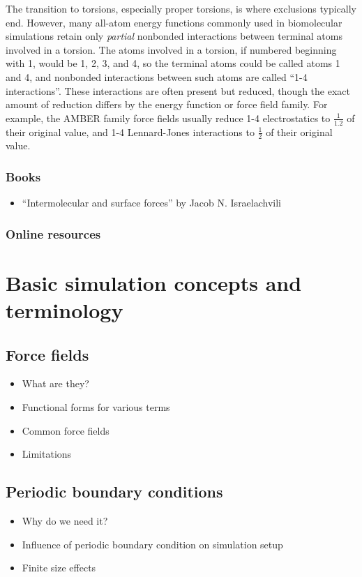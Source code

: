 \documentclass[9pt,bestpractices]{livecoms}
\begin{document}
The transition to torsions, especially proper torsions, is where exclusions
typically end.  However, many all-atom energy functions commonly used in
biomolecular simulations retain only \emph{partial} nonbonded
interactions between terminal atoms involved in a torsion.  The atoms
involved in a torsion, if numbered beginning with 1, would be 1, 2, 3,
and 4, so the terminal atoms could be called atoms 1 and 4, and
nonbonded interactions between such atoms are called ``1-4
interactions''.  These interactions are often present but reduced,
though the exact amount of reduction differs by the energy function or
force field family.  For example, the AMBER family force fields usually
reduce 1-4 electrostatics to $\frac{1}{1.2}$ of their original value,
and 1-4 Lennard-Jones interactions to $\frac{1}{2}$ of their original
value.


\subsubsection{Books}
\begin{itemize}
\item ``Intermolecular and surface forces'' by Jacob N. Israelachvili
\end{itemize}
\subsubsection{Online resources}

\section{Basic simulation concepts and terminology}

\subsection{Force fields}
\label{sec:force_fields}
\begin{itemize}
\item What are they?
\item Functional forms for various terms
\item Common force fields
\item Limitations
\end{itemize}

\subsection{Periodic boundary conditions}
\label{sec:periodic}
\begin{itemize}
\item Why do we need it?
\item Influence of periodic boundary condition on simulation setup
\item Finite size effects
\end{itemize}
\end{document}
